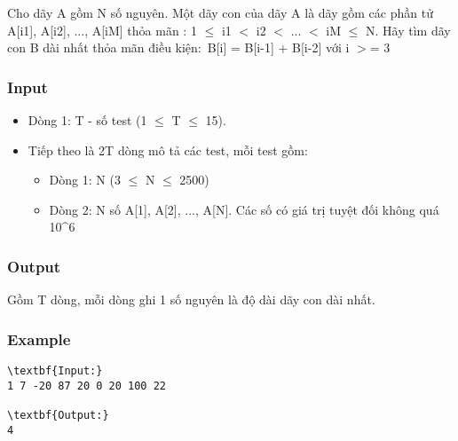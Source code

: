 

Cho dãy A gồm N số nguyên. Một dãy con của dãy A là dãy gồm các phần tử A[i1], A[i2], ..., A[iM] thỏa mãn : 1  $\le$  i1 $<$ i2 $<$ ... $<$ iM  $\le$  N. Hãy tìm dãy con B dài nhất thỏa mãn điều kiện: B[i] = B[i-1] + B[i-2] với i $>$= 3

\subsubsection{Input}
\begin{itemize}
	\item Dòng 1: T - số test (1  $\le$  T  $\le$  15).
	\item Tiếp theo là 2T dòng mô tả các test, mỗi test gồm:
\begin{itemize}
	\item Dòng 1: N (3  $\le$  N  $\le$  2500)
	\item Dòng 2: N số A[1], A[2], ..., A[N]. Các số có giá trị tuyệt đối không quá 10^6
\end{itemize}
\end{itemize}

\subsubsection{Output}

Gồm T dòng, mỗi dòng ghi 1 số nguyên là độ dài dãy con dài nhất.

\subsubsection{Example}
\begin{verbatim}
\textbf{Input:}
1 7 -20 87 20 0 20 100 22

\textbf{Output:}
4\end{verbatim}
